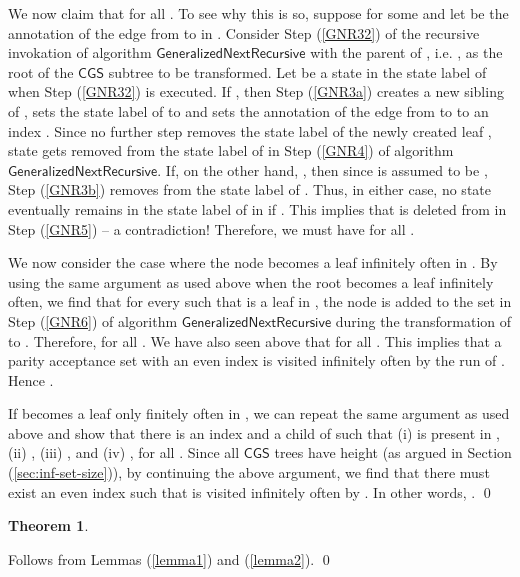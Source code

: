 \documentclass[3p]{elsarticle}
\newtheorem{theorem}{Theorem}
\newcommand{\CGS}{\ensuremath{\textsf{CGS }}}
\newcommand{\algo}[1]{\ensuremath{\textsf{{#1}}}}
\begin{document}
We now claim that  for all .  To see
why this is so, suppose  for some  and
let  be the annotation of the edge from  to  in .
Consider Step (\ref{GNR32}) of the recursive invokation of algorithm
\algo{GeneralizedNextRecursive} with the parent of , i.e. ,
as the root of the \CGS subtree to be transformed.  Let  be a
state in the state label of  when Step (\ref{GNR32}) is executed.
If , then Step (\ref{GNR3a}) creates a new sibling  of
, sets the state label of  to  and sets the
annotation of the edge from  to  to an index .  Since no
further step removes the state label of the newly created leaf ,
state  gets removed from the state label of  in Step
(\ref{GNR4}) of algorithm \algo{GeneralizedNextRecursive}.  If, on the
other hand, , then since  is assumed to be
, Step (\ref{GNR3b}) removes  from the state label of
.  Thus, in either case, no state eventually remains in the state
label of  in  if .  This implies that 
is deleted from  in Step (\ref{GNR5}) -- a contradiction!
Therefore, we must have  for all . 

We now consider the case where the node  becomes a leaf
infinitely often in .  By using the same argument
as used above when the root becomes a leaf infinitely often, we find
that for every  such that  is a leaf in , the node
 is added to the set  in Step (\ref{GNR6}) of algorithm
\algo{GeneralizedNextRecursive} during the transformation of 
to .  Therefore,  for all .  We have
also seen above that  for all .  This implies
that a parity acceptance set  with an even index  is visited
infinitely often by the run  of .  Hence .

If  becomes a leaf only finitely often in ,
we can repeat the same argument as used above and show that there is
an index  and a child  of  such that (i)  is
present in , (ii) , (iii) , and (iv) , for all
.  Since all \CGS trees  have height  (as argued
in Section (\ref{sec:inf-set-size})), by continuing the above
argument, we find that there must exist an even index  such that
 is visited infinitely often by .  In other words, .
\qed











\begin{theorem}

\end{theorem}



 Follows from Lemmas (\ref{lemma1}) and
(\ref{lemma2}). \qed
\end{document}

